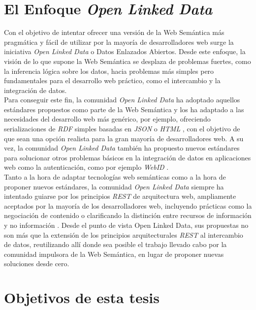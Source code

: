 \section{El Enfoque \textit{Open Linked Data}}
Con el objetivo de intentar ofrecer una versi\'on de la Web Sem\'antica m\'as pragm\'atica y f\'acil de utilizar por la mayor\'ia de desarrolladores web surge la iniciativa {\it Open Linked Data} o Datos Enlazados Abiertos. 
Desde este enfoque, la visi\'on de lo que supone la Web Sem\'antica se desplaza de problemas fuertes, como la inferencia l\'ogica sobre los datos, hacia problemas m\'as simples pero fundamentales para el desarrollo web pr\'actico, como el intercambio y la integraci\'on de datos.\\
Para conseguir este fin, la comunidad {\it Open Linked Data} ha adoptado aquellos est\'andares propuestos como parte de la Web Sem\'antica y los ha adaptado a las necesidades del desarrollo web m\'as gen\'erico, por ejemplo, ofreciendo serializaciones de {\it RDF} simples basadas en {\it JSON} \cite{jsonld} o {\it HTML} \cite{rdfa}, con el objetivo de que sean una opci\'on realista para la gran mayor\'ia de desarrolladores web. A su vez, la comunidad {\it Open Linked Data} tambi\'en ha propuesto nuevos est\'andares para solucionar otros problemas b\'asicos en la integraci\'on de datos en aplicaciones web como la autenticaci\'on, como por ejemplo {\it WebID} \cite{webid}.\\
Tanto a la hora de adaptar tecnolog\'ias web sem\'anticas como a la hora de proponer nuevos est\'andares, la comunidad {\it Open Linked Data} siempre ha intentado guiarse por los principios {\it REST} de arquitectura web, ampliamente aceptados por la mayor\'ia de los desarrolladores web, incluyendo pr\'acticas como la negociaci\'on de contenido \cite{holtman1998transparent} o clarificando la distinci\'on entre recursos de informaci\'on y no informaci\'on \cite{fielding2005httprange}. 
Desde el punto de vista Open Linked Data, sus propuestas no son m\'as que la extensi\'on de los principios arquitecturales {\it REST} al intercambio de datos, reutilizando all\'i donde sea posible el trabajo llevado cabo por la comunidad impulsora de la Web Sem\'antica, en lugar de proponer nuevas soluciones desde cero.

\section{Objetivos de esta tesis}


